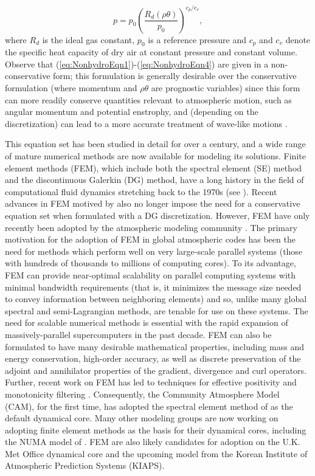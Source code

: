 \documentclass[11pt]{article}
\begin{document}
\begin{equation*}
p = p_0 \left( \frac{R_d (\rho \theta)}{p_0} \right)^{c_p / c_v},
\end{equation*} where $R_d$ is the ideal gas constant, $p_0$ is a reference pressure and $c_p$ and $c_v$ denote the specific heat capacity of dry air at constant pressure and constant volume.  Observe that (\ref{eq:NonhydroEqn1})-(\ref{eq:NonhydroEqn4}) are given in a non-conservative form; this formulation is generally desirable over the conservative formulation (where momentum and $\rho \theta$ are prognostic variables) since this form can more readily conserve quantities relevant to atmospheric motion, such as angular momentum and potential enstrophy, and (depending on the discretization) can lead to a more accurate treatment of wave-like motions \citep{JTTJW2005JCP}.

This equation set has been studied in detail for over a century, and a wide range of mature numerical methods are now available for modeling its solutions.  Finite element methods (FEM), which include both the spectral element (SE) method and the discontinuous Galerkin (DG) method, have a long history in the field of computational fluid dynamics stretching back to the 1970s (see \cite{patera:84,maday:89,FBSR1997JCP,BCCWS1998JCP}).  Recent advances in FEM motived by \cite{HTH2007AIAA} also no longer impose the need for a conservative equation set when formulated with a DG discretization.  However, FEM have only recently been adopted by the atmospheric modeling community \citep{taylor:97,FXGJSHTW2002JCP,FXGTER2004MWR,AFMTJT2004MWR,NTL2005MWR,FXGMR2008JCP,JFKFXG2012JCP}.  The primary motivation for the adoption of FEM in global atmospheric codes has been the need for methods which perform well on very large-scale parallel systems (those with hundreds of thousands to millions of computing cores).  To its advantage, FEM can provide near-optimal scalability on parallel computing systems with minimal bandwidth requirements (that is, it minimizes the message size needed to convey information between neighboring elements) and so, unlike many global spectral and semi-Lagrangian methods, are tenable for use on these systems.  The need for scalable numerical methods is essential with the rapid expansion of massively-parallel supercomputers in the past decade.  FEM can also be formulated to have many desirable mathematical properties, including mass and energy conservation, high-order accuracy, as well as discrete preservation of the adjoint and annihilator properties of the gradient, divergence and curl operators.  Further, recent work on FEM has led to techniques for effective positivity and monotonicity filtering \citep{OGMATASC2013}.  Consequently, the Community Atmosphere Model (CAM), for the first time, has adopted the spectral element method of \cite{MTAF2010JCP} as the default dynamical core.  Many other modeling groups are now working on adopting finite element methods as the basis for their dynamical cores, including the NUMA model of \cite{JFKFXG2012JCP}.  FEM are also likely candidates for adoption on the U.K. Met Office dynamical core and the upcoming model from the Korean Institute of Atmospheric Prediction Systems (KIAPS).
\end{document}
